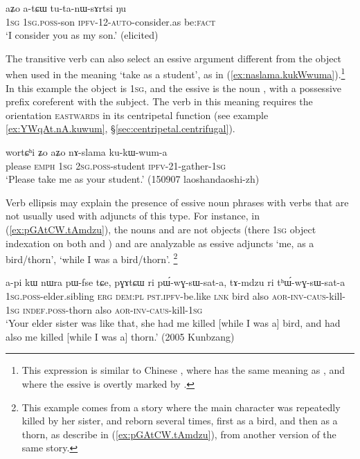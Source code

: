 \begin{exe}
\ex \label{ex:tutanWsArtsi}
 \gll aʑo a-tɕɯ tu-ta-nɯ-sɤrtsi ŋu \\
 \textsc{1sg} \textsc{1sg}.\textsc{poss}-son \textsc{ipfv}-1\fl{}2-\textsc{auto}-consider.as be:\textsc{fact} \\
 \glt `I consider you as my son.' (elicited)
\end{exe}


The transitive verb  can also select an essive argument different from the object when used in the meaning `take as a student', as in (\ref{ex:naslama.kukWwuma}).\footnote{This expression is similar to Chinese , where   has the same meaning as , and where the essive is overtly marked by  . } In this example the object is \textsc{1sg}, and the essive is the noun , with a possessive prefix coreferent with the subject. The verb  in this meaning requires the orientation \textsc{eastwards} in its centripetal function (see example \ref{ex:YWqAt.nA.kuwum}, §\ref{sec:centripetal.centrifugal}).

\begin{exe}
\ex \label{ex:naslama.kukWwuma}
 \gll wortɕʰi ʑo aʑo nɤ-slama ku-kɯ-wum-a \\
please \textsc{emph} \textsc{1sg} \textsc{2sg}.\textsc{poss}-student \textsc{ipfv}-2\fl{}1-gather-\textsc{1sg} \\
\glt `Please take me as your student.' (150907 laoshandaoshi-zh)
\end{exe}

Verb ellipsis may explain the presence of essive noun phrases with verbs that are not usually used with adjuncts of this type. For instance, in (\ref{ex:pGAtCW.tAmdzu}), the nouns  and  are not objects (there \textsc{1sg} object indexation on both  and ) and are analyzable as essive adjuncts `me, as a bird/thorn', `while I was a bird/thorn'. \footnote{This example comes from a story where the main character was repeatedly killed by her sister, and reborn several times, first as a bird, and then as a thorn, as describe in (\ref{ex:pGAtCW.tAmdzu}), from another version of the same story. }  

\begin{exe}
\ex \label{ex:pGAtCW.tAmdzu}
\gll a-pi kɯ nɯra pɯ-fse tɕe, pɣɤtɕɯ ri pɯ́-wɣ-sɯ-sat-a,  tɤ-mdzu ri tʰɯ́-wɣ-sɯ-sat-a  \\
\textsc{1sg}.\textsc{poss}-elder.sibling \textsc{erg} \textsc{dem}:\textsc{pl} \textsc{pst}.\textsc{ipfv}-be.like \textsc{lnk} bird also \textsc{aor}-\textsc{inv}-\textsc{caus}-kill-\textsc{1sg} \textsc{indef}.\textsc{poss}-thorn also \textsc{aor}-\textsc{inv}-\textsc{caus}-kill-\textsc{1sg} \\
\glt `Your elder sister was like that, she had me killed [while I was a] bird, and had also me killed [while I was a] thorn.' (2005 Kunbzang)
\end{exe}
 
